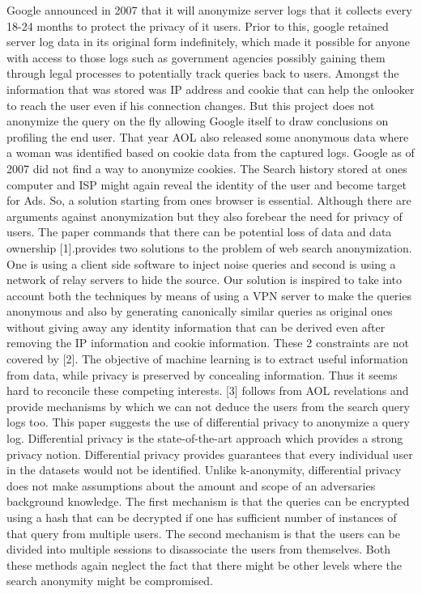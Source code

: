 \documentclass[10pt, a4paper, twocolumn]{article} %
\begin{document}
Google announced in 2007 that it will anonymize server logs that it collects every 18-24 months to protect the privacy of it users. Prior to this, google retained server log data in its original form indefinitely, which made it possible for anyone with access to those logs such as government agencies possibly gaining them through legal processes to potentially track queries back to users. Amongst the information that was stored was IP address and cookie that can help the onlooker to reach the user even if his connection changes. But this project does not anonymize the query on the fly allowing Google itself to draw conclusions on profiling the end user. That year AOL also released some anonymous data where a woman was identified based on cookie data from the captured logs. Google as of 2007 did not find a way to anonymize cookies. The Search history stored at ones computer and ISP might again reveal the identity of the user and become target for Ads. So, a solution starting from ones browser is essential. Although there are arguments against anonymization but they also forebear the need for privacy of users. The paper commands that there can be potential loss of data and data ownership [1].\newline
[2] provides two solutions to the problem of web search anonymization. One is using a client side software to inject noise queries and second is using a network of relay servers to hide the source. Our solution is inspired to take into account both the techniques by means of using a VPN server to make the queries anonymous and also by generating canonically similar queries as original ones without giving away any identity information that can be derived even after removing the IP information and cookie information. These 2 constraints are not covered by [2]. The objective of machine learning is to extract useful information from data, while privacy is preserved by concealing information. Thus it seems hard to reconcile these competing interests. [3] follows from AOL revelations and provide mechanisms by which we can not deduce the users from the search query logs too. This paper suggests the use of differential privacy to anonymize a query log. Differential privacy is the state-of-the-art approach which provides a strong privacy notion. Differential privacy provides guarantees that every individual user in the datasets would not be identified. Unlike k-anonymity, differential privacy does not make assumptions about the amount and scope of an adversaries background knowledge. The first mechanism is that the queries can be encrypted using a hash that can be decrypted if one has sufficient number of instances of that query from multiple users. The second mechanism is that the users can be divided into multiple sessions to disassociate the users from themselves. Both these methods again neglect the fact that there might be other levels where the search anonymity might be compromised.\newline
\end{document}

